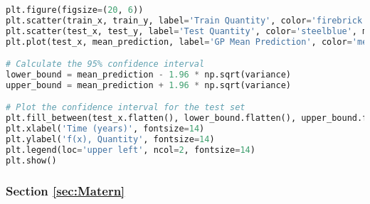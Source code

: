 \documentclass[12pt,a4paper]{article}
\begin{document}
\begin{lstlisting}[language=python, caption={Code of the Creation of Figures \ref{fig:SE dataset plot} and \ref{fig:SE GPregression}}]
plt.figure(figsize=(20, 6))
plt.scatter(train_x, train_y, label='Train Quantity', color='firebrick', marker='x', s=70)
plt.scatter(test_x, test_y, label='Test Quantity', color='steelblue', marker='x', s=70)
plt.plot(test_x, mean_prediction, label='GP Mean Prediction', color='mediumpurple', linewidth=3)

# Calculate the 95% confidence interval
lower_bound = mean_prediction - 1.96 * np.sqrt(variance)
upper_bound = mean_prediction + 1.96 * np.sqrt(variance)

# Plot the confidence interval for the test set
plt.fill_between(test_x.flatten(), lower_bound.flatten(), upper_bound.flatten(), color='plum', alpha=0.3, label='Credible Interval (95%)')
plt.xlabel('Time (years)', fontsize=14)
plt.ylabel('f(x), Quantity', fontsize=14)
plt.legend(loc='upper left', ncol=2, fontsize=14)
plt.show()
\end{lstlisting}

\subsubsection{Section \ref{sec:Matern}}
\end{document}
